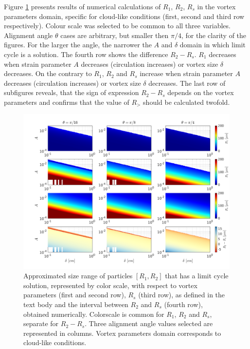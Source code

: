 \documentclass[../main.tex]{subfiles}
\begin{document}
Figure \ref{fig:ch4_5} presents results of numerical calculations of $R_1$, $R_2$, $R_s$ in the vortex parameters domain, specific for cloud-like conditions (first, second and third row respectively). Colour scale was selected to be common to all three variables. Alignment angle $\theta$ cases are arbitrary, but smaller then $\pi/4$, for the clarity of the figures. For the larger the angle, the narrower the $A$ and $\delta$ domain in which limit cycle is a solution. The fourth row shows the difference $R_2-R_s$. $R_1$ decreases when strain parameter $A$ decreases (circulation increases) or vortex size $\delta$ decreases. On the contrary to $R_1$, $R_2$ and $R_s$ increase when strain parameter $A$ decreases (circulation increases) or vortex size $\delta$ decreases. The last row of subfigures reveals, that the sign of expression $R_2-R_s$  depends on the vortex parameters and confirms that the value of $R_>$ should be calculated twofold.

\begin{figure}[h]
\centering
\noindent\includegraphics[width=35pc]{gfx/R1R2Rs.png}
\caption{Approximated size range of particles $[R_1,R_2]$ that has a limit cycle solution, represented by color scale, with respect to vortex parameters (first and second row), $R_s$ (third row), as defined in the text body and the interval between $R_2$ and $R_s$ (fourth row), obtained numerically. Colorscale is common for $R_1$, $R_2$ and $R_s$, separate for $R_2-R_s$. Three alignment angle values selected are represented in columns. Vortex parameters domain corresponds to cloud-like conditions.}
\label{fig:ch4_5}
\end{figure}
\end{document}
